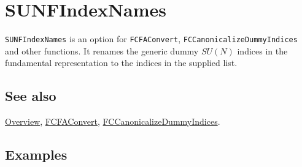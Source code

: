 \documentclass[../FeynCalcManual.tex]{subfiles}
\begin{document}
\hypertarget{sunfindexnames}{
\section{SUNFIndexNames}\label{sunfindexnames}}

\texttt{SUNFIndexNames} is an option for \texttt{FCFAConvert},
\texttt{FCCanonicalizeDummyIndices} and other functions. It renames the
generic dummy \(SU(N)\) indices in the fundamental representation to the
indices in the supplied list.

\subsection{See also}

\hyperlink{toc}{Overview}, \hyperlink{fcfaconvert}{FCFAConvert},
\hyperlink{fccanonicalizedummyindices}{FCCanonicalizeDummyIndices}.

\subsection{Examples}
\end{document}
